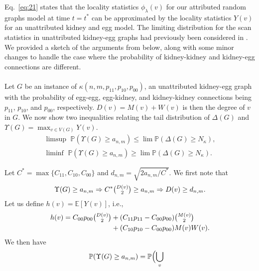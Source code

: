 \documentclass[10pt,journal,compsoc]{IEEEtran}
\theoremstyle{definition}
\begin{document}
\begin{IEEEproof}
\begin{equation}
\end{equation}
Eq.~\eqref{eq:21} states that the locality statistics
$\phi_\lambda(v)$ for our attributed random graphs model at time $t =
t^{*}$ can be approximated by the locality statistics $Y(v)$ for an
unattributed kidney and egg model. The limiting distribution for the
scan statistics in unattributed kidney-egg graphs had previously been
considered in \cite{rukhin:_limit_distr_graph_scan_statis}. We
provided a sketch of the arguments from
\cite{rukhin:_limit_distr_graph_scan_statis} below, along with some
minor changes to handle the case where the probability of
kidney-kidney and
kidney-egg connections are different. \\ \\
\noindent
Let $G$ be an instance of
$\kappa(n,m,p_{11}, p_{10}, p_{00})$, an unattributed kidney-egg graph
with the probability of egg-egg, egg-kidney, and kidney-kidney
connections being $p_{11}$, $p_{10}$, and $p_{00}$,
respectively. $D(v) = M(v) + W(v)$ is then the degree of $v$ in
$G$. We now show two inequalities relating the tail distribution of
$\Delta(G)$ and $\Upsilon(G) = \max_{v \in V(G)} Y(v)$.
\begin{gather}
  \label{eq:27}
    \limsup\,\, \mathbb{P}( \Upsilon(G) \geq a_{n,m} ) \leq \lim
   \mathbb{P}( \Delta(G) \geq N_\kappa), \\
   \label{eq:30}
  \liminf\,\, \mathbb{P}( \Upsilon(G) \geq a_{n,m} ) \geq \lim \mathbb{P}(
  \Delta(G) \geq N_{\kappa}).
\end{gather}
\begin{IEEEproof}[Eq.~\eqref{eq:27}]
 Let $C^{*} = \max\{C_{11},
C_{10}, C_{00}\}$ and $d_{n,m} = \sqrt{2 a_{n,m}/C^{*}}$. We first
note that
\begin{equation*}
\Upsilon(G) \geq a_{n,m} \Rightarrow C^{*} \tbinom{D(v)}{2} \geq
a_{n,m} \Rightarrow D(v) \geq d_{n,m}.
\end{equation*}
Let us define $h(v) = \mathbb{E}[Y(v)]$, i.e., 
\begin{equation*}
  \begin{split}
  h(v) = C_{00}p_{00} \tbinom{D(v)}{2} &+ (C_{11} p_{11} - C_{00}
  p_{00}) \tbinom{M(v)}{2} \\ &+ (C_{10} p_{10} - C_{00} p_{00}) M(v)
  W(v).
  \end{split}
\end{equation*}
We then have
  \begin{equation*}
    \label{eq:31}
    \begin{split}
    \mathbb{P}(\Upsilon(G) \geq a_{n,m}) &= \mathbb{P}\Bigl( \bigcup_{v
}
\end{split}
\end{equation*}
\end{IEEEproof}
\end{IEEEproof}
\end{document}
